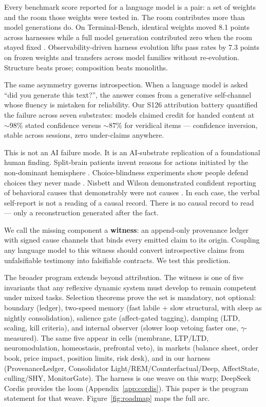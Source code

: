 \documentclass[11pt]{article}
\begin{document}
Every benchmark score reported for a language model is a pair: a set of
weights and the room those weights were tested in. The room contributes
more than model generations do. On Terminal-Bench, identical weights moved
8.1 points across harnesses while a full model generation contributed zero
when the room stayed fixed \citep{lin2026ahe}. Observability-driven harness
evolution lifts pass rates by 7.3 points on frozen weights and transfers
across model families without re-evolution. Structure beats prose;
composition beats monoliths.

The same asymmetry governs introspection. When a language model is asked
``did you generate this text?'', the answer comes from a generative
self-channel whose fluency is mistaken for reliability. Our S126
attribution battery \citep{s126} quantified the failure across seven
substrates:
models claimed credit for handed content at ${\sim}98\%$ stated confidence
versus ${\sim}87\%$ for veridical items --- confidence inversion, stable
across sessions, zero under-claims anywhere.

This is not an AI failure mode. It is an AI-substrate replication of a
foundational human finding. Split-brain patients invent reasons for actions
initiated by the non-dominant hemisphere \citep{gazzaniga2000}.
Choice-blindness experiments show people defend choices they never made
\citep{johansson2005}. Nisbett and Wilson demonstrated confident reporting
of behavioral causes that demonstrably were not causes \citep{nisbett1977}. In each case, the verbal self-report is
not a reading of a causal record. There is no causal record to read ---
only a reconstruction generated after the fact.

We call the missing component a \textbf{witness}: an append-only
provenance ledger with signed cause channels that binds every emitted
claim to its origin. Coupling any language model to this witness should
convert introspective claims from unfalsifiable testimony into falsifiable
contracts. We test this prediction.

The broader program extends beyond attribution. The witness is one of
five invariants that any reflexive dynamic system must develop to remain
competent under mixed tasks. Selection theorems \citep{nayebi2026}
prove the set is mandatory, not optional: boundary (ledger), two-speed
memory (fast labile + slow structural, with sleep as nightly
consolidation), salience gate (affect-gated tagging), damping (LTD,
scaling, kill criteria), and internal observer (slower loop vetoing
faster one, $\gamma$-measured). The same five appear in cells
(membrane, LTP/LTD, neuromodulation, homeostasis, prefrontal veto), in
markets (balance sheet, order book, price impact, position limits, risk
desk), and in our harness (ProvenanceLedger, Consolidator
Light/REM/Counterfactual/Deep, AffectState, culling/SHY, MonitorGate).
The harness is one weave on this warp; DeepSeek Cordis provides the
loom (Appendix~\ref{app:cordis}). This paper is the program statement
for that weave. Figure~\ref{fig:roadmap} maps the full arc.
\end{document}
